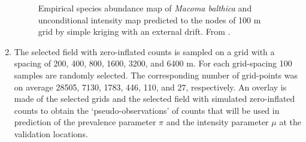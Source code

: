 \documentclass[review]{elsarticle}
\begin{document}
\begin{enumerate}
\begin{figure}[htbp]
\quad
{}
\caption{Empirical species abundance map of \textit{Macoma balthica} \protect{} and unconditional intensity map \protect{} predicted to the nodes of 100 m grid by simple kriging with an external drift. From \citet{lyashevska2015a}.}
\label{fig:rawfield}
\end{figure}

\item
The selected field with zero-inflated counts is sampled on a grid with a spacing of 200, 400, 800, 1600, 3200, and 6400 m. For each grid-spacing 100 samples are randomly selected. The corresponding number of grid-points was on average 28505, 7130, 1783, 446, 110, and 27, respectively. An overlay is made of the selected grids and the selected field with simulated zero-inflated counts to obtain the `pseudo-observations' of counts that will be used in prediction of the prevalence parameter $\pi$ and the intensity parameter $\mu$ at the validation locations.


\end{enumerate}
\end{document}
